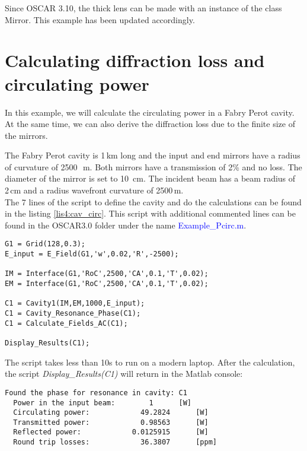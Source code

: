 Since OSCAR 3.10, the thick lens can be made with an instance of the class Mirror. This example has been updated accordingly.

\section{Calculating diffraction loss and circulating power}

In this example, we will calculate the circulating power in a Fabry Perot cavity. At the same time, we can also derive the diffraction loss due to the finite size of the mirrors.

The Fabry Perot cavity is 1\,km long and the input and end mirrors have a radius of curvature of 2500~\,m. Both mirrors have a transmission of 2\% and no loss. The diameter of the mirror is set to 10~cm. The incident beam has a beam radius of 2\,cm and a radius wavefront curvature of 2500\,m.\\

The 7 lines of the script to define the cavity and do the calculations can be found in the listing \ref{lis4:cav_circ}. This script with additional commented lines can be found in the OSCAR3.0 folder under the name \textcolor{blue}{Example\_Pcirc.m}.

\begin{lstlisting}[float=htp,caption=Example of OSCAR script to calculate the circulating power\label{lis4:cav_circ},frame=lines]
G1 = Grid(128,0.3);
E_input = E_Field(G1,'w',0.02,'R',-2500);

IM = Interface(G1,'RoC',2500,'CA',0.1,'T',0.02);
EM = Interface(G1,'RoC',2500,'CA',0.1,'T',0.02);

C1 = Cavity1(IM,EM,1000,E_input);
C1 = Cavity_Resonance_Phase(C1);
C1 = Calculate_Fields_AC(C1);

Display_Results(C1);
\end{lstlisting}

The script takes less than 10s to run on a modern laptop. After the calculation, the script \emph{Display\_Results(C1)} will return in the Matlab console:

\newpage

\begin{verbatim}
Found the phase for resonance in cavity: C1
  Power in the input beam: 	      1 	 [W]
  Circulating power: 		    49.2824 	 [W]
  Transmitted power: 		    0.98563 	 [W]
  Reflected power: 			  0.0125915 	 [W]
  Round trip losses: 		    36.3807 	 [ppm] 
\end{verbatim}



